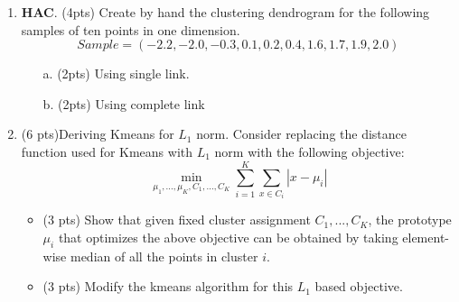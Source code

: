 \documentclass{article}
\begin{document}
\begin{enumerate}

\item {\bf HAC}. (4pts) Create by hand the clustering dendrogram for the following samples of ten points in one dimension.
\[Sample=( - 2.2, -2.0, -0.3, 0.1, 0.2, 0.4, 1.6, 1.7, 1.9, 2.0)\]
\begin{itemize}
\item[a.] (2pts) Using single link.\\

\item[b.] (2pts) Using complete link \\

\end{itemize}


\item (6 pts)Deriving Kmeans for $L_1$ norm. 
Consider replacing the distance function used for Kmeans with $L_1$ norm with the following objective:
\[\min_{\mu_1,...,\mu_K,C_1,...,C_K}\sum_{i=1}^K \sum_{x\in C_i} |x-\mu_i|\]

\begin{itemize}
    \item (3 pts) Show that given fixed cluster assignment $C_1, ..., C_K$, the prototype $\mu_i$ that optimizes the above objective can be obtained by taking element-wise median of all the points in cluster $i$.


\item  (3 pts) Modify the kmeans algorithm for this $L_1$ based objective.\\
\end{itemize}
\end{enumerate}
\end{document}
